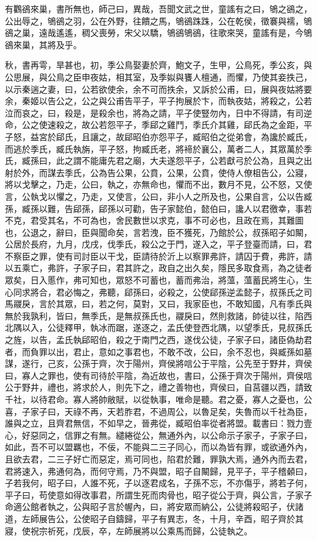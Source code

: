 \begin{pinyinscope}
有鸜鵒來巢，書所無也，師己曰，異哉，吾聞文武之世，童謠有之曰，鴝之鵒之，公出辱之，鴝鵒之羽，公在外野，往饋之馬，鴝鵒跦跦，公在乾侯，徵褰與襦，鴝鵒之巢，遠哉遙遙，稠父喪勞，宋父以驕，鴝鵒鴝鵒，往歌來哭，童謠有是，今鴝鵒來巢，其將及乎。

秋，書再雩，旱甚也，初，季公鳥娶妻於齊，鮑文子，生甲，公鳥死，季公亥，與公思展，與公鳥之臣申夜姑，相其室，及季姒與饔人檀通，而懼，乃使其妾抶己，以示秦遄之妻，曰，公若欲使余，余不可而抶余，又訴於公甫，曰，展與夜姑將要余，秦姬以告公之，公之與公甫告平子，平子拘展於卞，而執夜姑，將殺之，公若泣而哀之，曰，殺是，是殺余也，將為之請，平子使豎勿內，日中不得請，有司逆命，公之使速殺之，故公若怨平子，季郈之雞鬥，季氏介其雞，郈氏為之金距，平子怒，益宮於郈氏，且讓之，故郈昭伯亦怨平子，臧昭伯之從弟會，為讒於臧氏，而逃於季氏，臧氏執旃，平子怒，拘臧氏老，將褅於襄公，萬者二人，其眾萬於季氏，臧孫曰，此之謂不能庸先君之廟，大夫遂怨平子，公若獻弓於公為，且與之出射於外，而謀去季氏，公為告公果，公賁，公果，公賁，使侍人僚柤告公，公寢，將以戈擊之，乃走，公曰，執之，亦無命也，懼而不出，數月不見，公不怒，又使言，公執戈以懼之，乃走，又使言，公曰，非小人之所及也，公果自言，公以告臧孫，臧孫以難，告郈孫，郈孫以可勸，告子家懿伯，懿伯曰，讒人以君徼幸，事若不克，君受其名，不可為也，舍民數世以求克，事不可必也，且政在焉，其難圖也，公退之，辭曰，臣與聞命矣，言若洩，臣不獲死，乃館於公，叔孫昭子如闞，公居於長府，九月，戊戌，伐季氏，殺公之于門，遂入之，平子登臺而請，曰，君不察臣之罪，使有司討臣以干戈，臣請待於沂上以察罪弗許，請囚于費，弗許，請以五乘亡，弗許，子家子曰，君其許之，政自之出久矣，隱民多取食焉，為之徒者眾矣，日入慝作，弗可知也，眾怒不可蓄也，蓄而弗治，將薀，薀蓄民將生心，生心同求將合，君必悔之，弗聽，郈孫曰，必殺之，公使郈孫逆孟懿子，叔孫氏之司馬鬷戾，言於其眾，曰，若之何，莫對，又曰，我家臣也，不敢知國，凡有季氏與無於我孰利，皆曰，無季氏，是無叔孫氏也，鬷戾曰，然則救諸，帥徒以往，陷西北隅以入，公徒釋甲，執冰而踞，遂逐之，孟氏使登西北隅，以望季氏，見叔孫氏之旌，以告，孟氏執郈昭伯，殺之于南門之西，遂伐公徒，子家子曰，諸臣偽劫君者，而負罪以出，君止，意如之事君也，不敢不改，公曰，余不忍也，與臧孫如墓謀，遂行，己亥，公孫于齊，次于陽州，齊侯將唁公于平陰，公先至于野井，齊侯曰，寡人之罪也，使有司待於平陰，為近故也，書曰，公孫于齊次于陽州，齊侯唁公于野井，禮也，將求於人，則先下之，禮之善物也，齊侯曰，自莒疆以西，請致千社，以待君命。寡人將帥敝賦，以從執事，唯命是聽。君之憂，寡人之憂也，公喜，子家子曰，天祿不再，天若胙君，不過周公，以魯足矣，失魯而以千社為臣，誰與之立，且齊君無信，不如早之，晉弗從，臧昭伯率從者將盟。載書曰：戮力壹心，好惡同之，信罪之有無。繾綣從公，無通外內，以公命示子家子，子家子曰，如此，吾不可以盟羈也，不佞，不能與二三子同心，而以為皆有罪，或欲通外內，且欲去君，二三子好亡而惡定，焉可同也，陷君於難，罪孰大焉，通外內而去君，君將速入，弗通何為，而何守焉，乃不與盟，昭子自闞歸，見平子，平子稽顙曰，子若我何，昭子曰，人誰不死，子以逐君成名，子孫不忘，不亦傷乎，將若子何，平子曰，苟使意如得改事君，所謂生死而肉骨也，昭子從公于齊，與公言，子家子命適公館者執之，公與昭子言於幄內，曰，將安眾而納公，公徒將殺昭子，伏諸道，左師展告公，公使昭子自鑄歸，平子有異志，冬，十月，辛酉，昭子齊於其寢，使祝宗祈死，戊辰，卒，左師展將以公乘馬而歸，公徒執之。


\end{pinyinscope}

